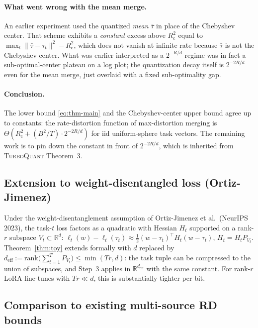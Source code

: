 \documentclass{article}
\theoremstyle{remark}
\newcommand{\R}{\mathbb{R}}
\newcommand{\rank}{\mathrm{rank}}
\newcommand{\cheb}{R_{\mathrm{c}}}
\begin{document}
\paragraph{What went wrong with the mean merge.} An earlier
experiment used the quantized \emph{mean} $\bar\tau$ in place of
the Chebyshev center. That scheme exhibits a \emph{constant} excess
above $\cheb^2$ equal to $\max_t\|\bar\tau - \tau_t\|^2 - \cheb^2$,
which does not vanish at infinite rate because $\bar\tau$ is not the
Chebyshev center. What was earlier interpreted as a $2^{-R/d}$
regime was in fact a sub-optimal-center plateau on a log plot; the
quantization decay itself is $2^{-2R/d}$ even for the mean merge,
just overlaid with a fixed sub-optimality gap.

\paragraph{Conclusion.} The lower bound \eqref{eq:thm-main} and the
Chebyshev-center upper bound agree up to constants: the
rate-distortion function of max-distortion merging is
$\Theta\!\left(\cheb^2 + (B^2/T)\cdot 2^{-2R/d}\right)$ for iid
uniform-sphere task vectors. The remaining work is to pin down
the constant in front of $2^{-2R/d}$, which is inherited from
\textsc{TurboQuant} Theorem~3.

\subsection{Extension to weight-disentangled loss (Ortiz-Jimenez)}
\label{sec:rank-r-ext}

Under the weight-disentanglement assumption of Ortiz-Jimenez et
al.~(NeurIPS 2023), the task-$t$ loss factors as a quadratic with
Hessian $H_t$ supported on a rank-$r$ subspace $V_t \subset \R^d$:
$\ell_t(w) - \ell_t(\tau_t) \approx \frac12 (w-\tau_t)^\top H_t
(w - \tau_t)$, $H_t = H_t P_{V_t}$. Theorem~\ref{thm:toy} extends
formally with $d$ replaced by
$d_{\mathrm{eff}} := \rank\bigl(\sum_{t=1}^T P_{V_t}\bigr) \leq
\min(Tr, d)$: the task tuple can be compressed to the union of
subspaces, and Step~3 applies in $\R^{d_{\mathrm{eff}}}$ with the same
constant. For rank-$r$ LoRA fine-tunes with $Tr \ll d$, this is
substantially tighter per bit.

\subsection{Comparison to existing multi-source RD bounds}
\end{document}
